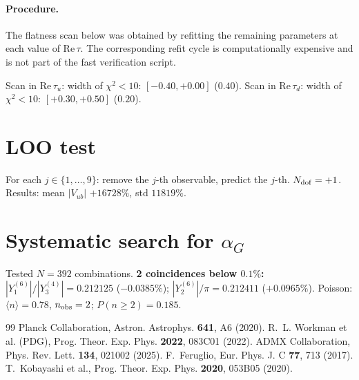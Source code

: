 \documentclass[12pt,a4paper]{article}
\numberwithin{equation}{section}
\begin{document}
\paragraph{Procedure.}
The flatness scan below was obtained by refitting the remaining parameters at each value of \(\mathrm{Re}\,\tau\). The corresponding refit cycle is computationally expensive and is not part of the fast verification script.

Scan in \(\mathrm{Re}\,\tau_u\): width of \(\chi^2<10\): \([-0.40, +0.00]\) (\(0.40\)).
Scan in \(\mathrm{Re}\,\tau_d\): width of \(\chi^2<10\): \([+0.30, +0.50]\) (\(0.20\)).

\section{LOO test}
For each \(j \in \{1,\ldots,9\}\): remove the \(j\)-th observable, predict the \(j\)-th. \(N_{\rm dof} = +1\). Results: mean \(|V_{ub}|\) \(+16728\%\), std \(11819\%\).

\section{Systematic search for \(\alpha_G\)}
Tested \(N = 392\) combinations. \textbf{2 coincidences below \(0.1\%\):}
\(|Y^{(6)}_1|/|Y^{(4)}_3| = 0.212125\) (\(-0.0385\%\));
\(|Y^{(6)}_2|/\pi = 0.212411\) (\(+0.0965\%\)).
Poisson: \(\langle n\rangle = 0.78\), \(n_{\rm obs} = 2\); \(P(n \ge 2) = 0.185\).

\begin{thebibliography}{99}
 Planck Collaboration, Astron. Astrophys. \textbf{641}, A6 (2020).
 R.~L. Workman et al. (PDG), Prog. Theor. Exp. Phys. \textbf{2022}, 083C01 (2022).
 ADMX Collaboration, Phys. Rev. Lett. \textbf{134}, 021002 (2025).
 F.~Feruglio, Eur. Phys. J. C \textbf{77}, 713 (2017).
 T.~Kobayashi et al., Prog. Theor. Exp. Phys. \textbf{2020}, 053B05 (2020).
\end{thebibliography}
\end{document}
